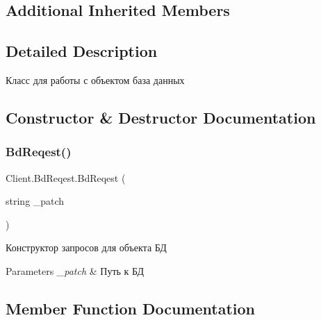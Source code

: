 \subsection*{Additional Inherited Members}


\subsection{Detailed Description}
Класс для работы с объектом база данных 



\subsection{Constructor \& Destructor Documentation}
\hypertarget{class_client_1_1_bd_reqest_a782e678c91671039896a90ac999b8966}{}\label{class_client_1_1_bd_reqest_a782e678c91671039896a90ac999b8966} 
\subsubsection{\texorpdfstring{Bd\+Reqest()}{BdReqest()}}
{\footnotesize\ttfamily Client.\+Bd\+Reqest.\+Bd\+Reqest (\begin{DoxyParamCaption}\item[{string}]{\+\_\+patch }\end{DoxyParamCaption})\hspace{0.3cm}{\ttfamily [inline]}}



Конструктор запросов для объекта БД 


\begin{DoxyParams}{Parameters}
{\em \+\_\+patch} & Путь к БД\\
\hline
\end{DoxyParams}


\subsection{Member Function Documentation}
\hypertarget{class_client_1_1_bd_reqest_ab782415f646f42b5c4e64b74d68d0bcf}{}\label{class_client_1_1_bd_reqest_ab782415f646f42b5c4e64b74d68d0bcf} 
